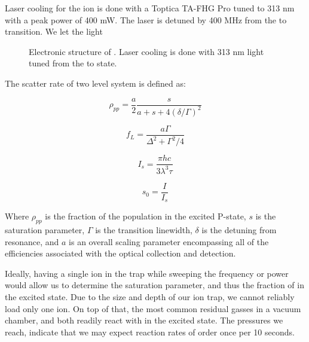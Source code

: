 Laser cooling for the  ion is done with a Toptica TA-FHG Pro tuned to 313 nm with a peak power of 400 mW. The laser is detuned by 400 MHz from the  to  transition. We let the light

\begin{figure}[H]
	\centering
	\caption{Electronic structure of . Laser cooling is done with 313 nm light tuned from the  to  state.}
\end{figure}

The scatter rate of two level system is defined as:

\begin{equation}
	\rho_{pp} = \frac{a}{2} \frac{s}{a+s+4(\delta/\Gamma)^2}
\end{equation}

\begin{equation}
	f_L = \frac{a \Gamma}{\Delta^2 + \Gamma^2/4}
\end{equation}

\begin{equation}
	I_s = \frac{\pi h c}{3 \lambda^3 \tau}
\end{equation}

\begin{equation}
	s_0 = \frac{I}{I_s}
\end{equation}

Where $\rho_{pp}$ is the fraction of the population in the excited P-state, $s$ is the saturation parameter, $\Gamma$ is the transition linewidth, $\delta$ is the detuning from resonance, and $a$ is an overall scaling parameter encompassing all of the efficiencies associated with the optical collection and detection.


Ideally, having a single ion in the trap while sweeping the frequency or power would allow us to determine the saturation parameter, and thus the fraction of  in the excited  state. Due to the size and depth of our ion trap, we cannot reliably load only one ion. On top of that, the most common residual gasses in a vacuum chamber,  and  both readily react with  in the excited state. The pressures we reach, indicate that we may expect reaction rates of order once per 10 seconds.


